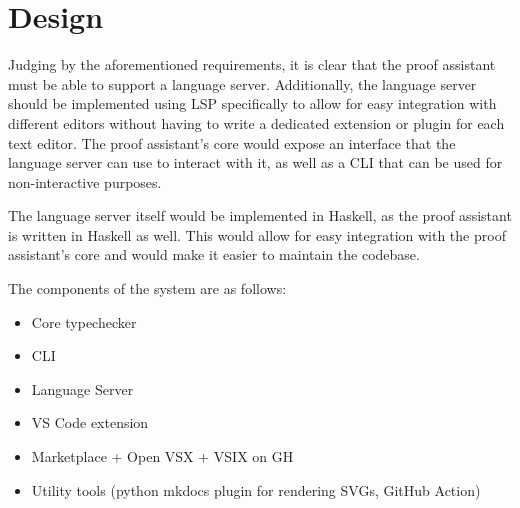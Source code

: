 \section{Design}

Judging by the aforementioned requirements, it is clear that the proof assistant must be able to support a language server.
Additionally, the language server should be implemented using LSP specifically to allow for easy integration with
different editors without having to write a dedicated extension or plugin for each text editor.
The proof assistant's core would expose an interface that the language server can use to interact with it,
as well as a CLI that can be used for non-interactive purposes.

The language server itself would be implemented in Haskell, as the proof assistant is written in Haskell as well.
This would allow for easy integration with the proof assistant's core and would make it easier to maintain the codebase.

The components of the system are as follows:

\begin{itemize}
  \item Core typechecker
  \item CLI
  \item Language Server
  \item VS Code extension
  \item Marketplace + Open VSX + VSIX on GH
  \item Utility tools (python mkdocs plugin for rendering SVGs, GitHub Action)
\end{itemize}
